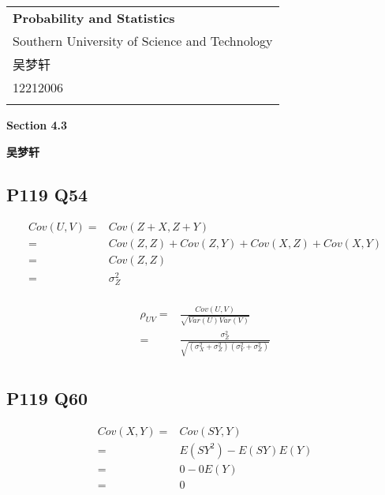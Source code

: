 \documentclass[a4paper,12pt]{ctexart}
\begin{document}
\thispagestyle{empty} %

\begin{tabular}{p{15.5cm}}
{\large \bf Probability and Statistics} \\
Southern University of Science and Technology \\ 吴梦轩 \\ 12212006 \\
\hline
\\
\end{tabular}

\vspace*{0.3cm} %

\begin{center}
	{\Large \bf Section 4.3}
	\vspace{2mm}

	{\bf 吴梦轩}
		
\end{center}  

\vspace{0.4cm}


\subsection*{P119 Q54}

\begin{align*}
	Cov(U,V) =& Cov(Z+X,Z+Y) \\	
			 =& Cov(Z,Z) + Cov(Z,Y) + Cov(X,Z) + Cov(X,Y) \\
			 =& Cov(Z,Z) \\
			 =& \sigma_Z^2 \\ 
\end{align*}

\begin{align*}
	\rho_{UV} =& \frac{Cov(U,V)}{\sqrt{Var(U)Var(V)}} \\
			  =& \frac{\sigma_Z^2}{\sqrt{(\sigma_X^2+\sigma_Z^2)(\sigma_Y^2+\sigma_Z^2)}} \\
\end{align*}

\subsection*{P119 Q60}

\begin{align*}
	Cov(X,Y) =& Cov(SY,Y) \\
			 =& E(SY^2) - E(SY)E(Y) \\
			 =& 0 - 0 E(Y) \\
			 =& 0 
\end{align*}
\end{document}
